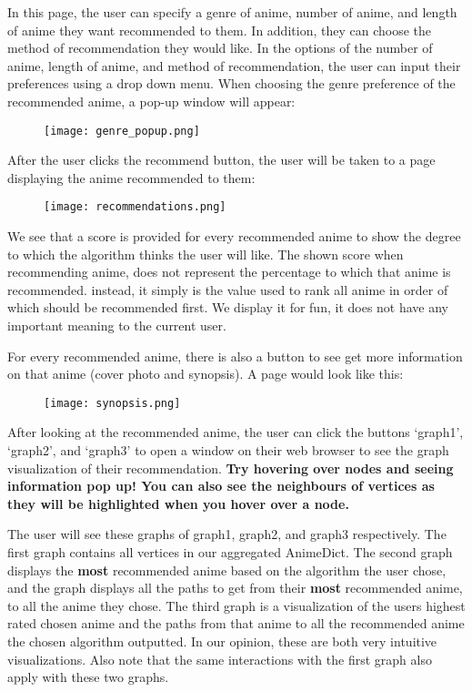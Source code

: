 \documentclass[fontsize=11pt]{article}
\begin{document}
\item[] In this page, the user can specify a genre of anime, number of anime, and length of anime they want recommended to them. In addition, they can choose the method of recommendation they would like. In the options of the number of anime, length of anime, and method of recommendation, the user can input their preferences using a drop down menu. When choosing the genre preference of the recommended anime, a pop-up window will appear:

\begin{figure}[htp]
    \centering
    \texttt{[image: genre\_popup.png]}
\end{figure}

\newpage

\item[] After the user clicks the recommend button, the user will be taken to a page displaying the anime recommended to them:
\begin{figure}[htp]
    \centering
    \texttt{[image: recommendations.png]}
\end{figure}

\item[]We see that a score is provided for every recommended anime to show the degree to which the algorithm thinks the user will like. The shown score when recommending anime, does not represent the percentage to which that anime is recommended. instead, it simply is the value used to rank all anime in order of which should be recommended first. We display it for fun, it does not have any important meaning to the current user. 

\item[]For every recommended anime, there is also a button to see get more information on that anime (cover photo and synopsis). A page would look like this:
\begin{figure}[htp]
    \centering
    \texttt{[image: synopsis.png]}
\end{figure}

\item[] After looking at the recommended anime, the user can click the buttons `graph1', `graph2', and `graph3' to open a window on their web browser to see the graph visualization of their recommendation. \textbf{Try hovering over nodes and seeing information pop up! You can also see the neighbours of vertices as they will be highlighted when you hover over a node.}

\newpage
\item[]The user will see these graphs of graph1, graph2, and graph3 respectively. The first graph contains all vertices in our aggregated AnimeDict. The second graph displays the \textbf{most} recommended anime based on the algorithm the user chose, and the graph displays all the paths to get from their \textbf{most} recommended anime, to all the anime they chose. The third graph is a visualization of the users highest rated chosen anime and the paths from that anime to all the recommended anime the chosen algorithm outputted. In our opinion, these are both very intuitive visualizations. Also note that the same interactions with the first graph also apply with these two graphs.  
\end{document}
